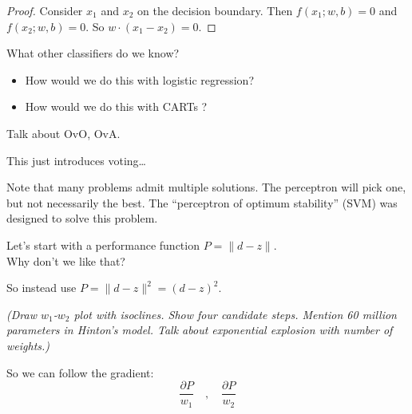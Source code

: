 \begin{proof}
  Consider $x_1$ and $x_2$ on the decision boundary.  Then
  $f(x_1; w, b) = 0$ and $f(x_2; w, b) = 0$.  So
  $w\cdot (x_1 - x_2) = 0$.
\end{proof}





What other classifiers do we know?
\begin{itemize}
\item How would we do this with logistic regression?
\item How would we do this with CARTs ?
\end{itemize}

Talk about OvO, OvA.

This just introduces voting\dots

Note that many problems admit multiple solutions.  The perceptron will
pick one, but not necessarily the best.  The ``perceptron of optimum
stability'' (SVM) was designed to solve this problem.



\medskip

\medskip

Let's start with a performance function $P=\| d-z \|$.  \\
Why don't we like that?

So instead use $P=\| d-z \|^2 = (d-z)^2$.

\textit{(Draw $w_1$-$w_2$ plot with isoclines.  Show four candidate
  steps.  Mention 60 million parameters in Hinton's model.  Talk about
  exponential explosion with number of weights.)}

So we can follow the gradient:
\begin{displaymath}
  \frac{\partial P}{w_1} \quad , \quad   \frac{\partial P}{w_2}
\end{displaymath}

